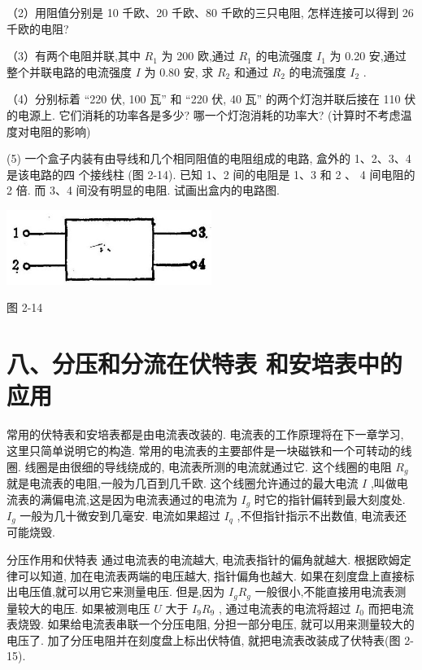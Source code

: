 \documentclass[10pt]{article}
\begin{document}
（2）用阻值分别是 10 千欧、20 千欧、80 千欧的三只电阻, 怎样连接可以得到 26 千欧的电阻?

（3）有两个电阻并联,其中 \({R}_{1}\) 为 200 欧,通过 \({R}_{1}\) 的电流强度 \({I}_{1}\) 为 0.20 安,通过整个并联电路的电流强度 \(I\) 为 0.80 安, 求 \({R}_{2}\) 和通过 \({R}_{2}\) 的电流强度 \({I}_{2}\) .

（4）分别标着 “220 伏, 100 瓦” 和 “220 伏, 40 瓦” 的两个灯泡并联后接在 110 伏的电源上. 它们消耗的功率各是多少? 哪一个灯泡消耗的功率大? (计算时不考虑温度对电阻的影响)

(5) 一个盒子内装有由导线和几个相同阻值的电阻组成的电路, 盒外的 1、2、3、4 是该电路的四 个接线柱 (图 2-14). 已知 1、2 间的电阻是 1、3 和 2 、 4 间电阻的 2 倍. 而 3、4 间没有明显的电阻. 试画出盒内的电路图.

\begin{center}
\includegraphics[max width=0.5\textwidth]{images/01913056-1f15-74d8-9184-9aab52c9d66b_81_789220.jpg}
\end{center}

图 2-14

\section*{八、分压和分流在伏特表 和安培表中的应用}

常用的伏特表和安培表都是由电流表改装的. 电流表的工作原理将在下一章学习, 这里只简单说明它的构造. 常用的电流表的主要部件是一块磁铁和一个可转动的线圈. 线圈是由很细的导线绕成的, 电流表所测的电流就通过它. 这个线圈的电阻 \({R}_{g}\) 就是电流表的电阻,一般为几百到几千欧. 这个线圈允许通过的最大电流 \(I\) ,叫做电流表的满偏电流,这是因为电流表通过的电流为 \({I}_{g}\) 时它的指针偏转到最大刻度处. \({I}_{g}\) 一般为几十微安到几毫安. 电流如果超过 \({I}_{q}\) ,不但指针指示不出数值, 电流表还可能烧毁.

分压作用和伏特表 通过电流表的电流越大, 电流表指针的偏角就越大. 根据欧姆定律可以知道, 加在电流表两端的电压越大, 指针偏角也越大. 如果在刻度盘上直接标出电压值,就可以用它来测量电压. 但是,因为 \({I}_{g}{R}_{g}\) 一般很小,不能直接用电流表测量较大的电压. 如果被测电压 \(U\) 大于 \({I}_{9}{R}_{9}\) , 通过电流表的电流将超过 \({I}_{0}\) 而把电流表烧毁. 如果给电流表串联一个分压电阻, 分担一部分电压, 就可以用来测量较大的电压了. 加了分压电阻并在刻度盘上标出伏特值, 就把电流表改装成了伏特表(图 2-15).
\end{document}
